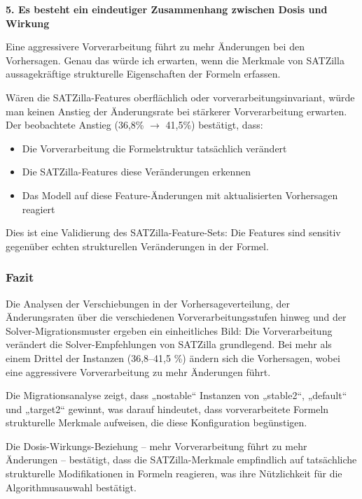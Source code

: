 \textbf{5. Es besteht ein eindeutiger Zusammenhang zwischen Dosis und Wirkung}

Eine aggressivere Vorverarbeitung führt zu mehr Änderungen bei den Vorhersagen. Genau das würde ich 
erwarten, wenn die Merkmale von SATZilla aussagekräftige strukturelle Eigenschaften der Formeln erfassen.

Wären die SATZilla-Features oberflächlich oder vorverarbeitungsinvariant, würde man keinen Anstieg der Änderungsrate bei stärkerer Vorverarbeitung erwarten. Der beobachtete Anstieg (36,8\% $\rightarrow$ 41,5\%) bestätigt, dass:
\begin{itemize}
    \setlength{\itemsep}{0pt}
    \setlength{\parskip}{0pt}
    \setlength{\parsep}{0pt}
    \item Die Vorverarbeitung die Formelstruktur tatsächlich verändert
    \item Die SATZilla-Features diese Veränderungen erkennen
    \item Das Modell auf diese Feature-Änderungen mit aktualisierten Vorhersagen reagiert
\end{itemize}

Dies ist eine Validierung des SATZilla-Feature-Sets: Die Features sind sensitiv gegenüber echten 
strukturellen Veränderungen in der Formel.

\subsubsection{Fazit}

Die Analysen der Verschiebungen in der Vorhersageverteilung, der Änderungsraten über die verschiedenen 
Vorverarbeitungsstufen hinweg und der Solver-Migrationsmuster ergeben ein einheitliches Bild: Die 
Vorverarbeitung verändert die Solver-Empfehlungen von SATZilla grundlegend. Bei mehr als einem Drittel 
der Instanzen (36,8–41,5 \%) ändern sich die Vorhersagen, wobei eine aggressivere Vorverarbeitung 
zu mehr Änderungen führt.  

Die Migrationsanalyse zeigt, dass „nostable“ Instanzen von „stable2“, „default“ und „target2“ gewinnt, 
was darauf hindeutet, dass vorverarbeitete Formeln strukturelle Merkmale aufweisen, die diese 
Konfiguration begünstigen.

Die Dosis-Wirkungs-Beziehung – mehr Vorverarbeitung führt zu mehr Änderungen – bestätigt, dass die 
SATZilla-Merkmale empfindlich auf tatsächliche strukturelle Modifikationen in Formeln reagieren, 
was ihre Nützlichkeit für die Algorithmusauswahl bestätigt. 

